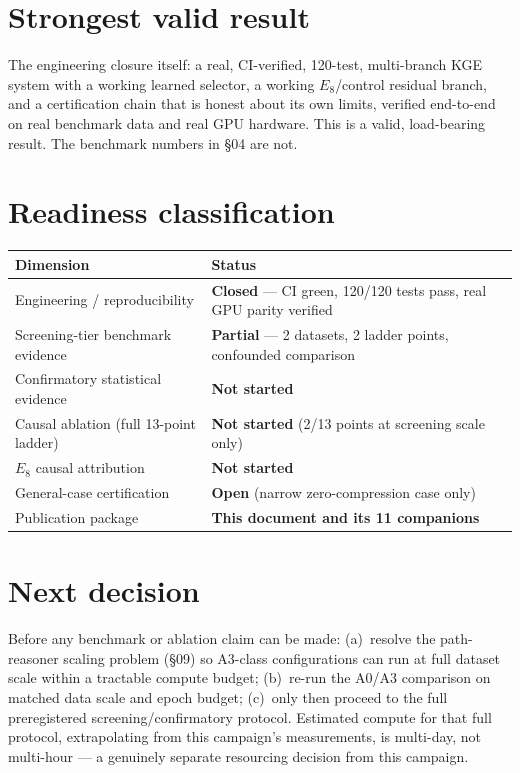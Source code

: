 \documentclass[11pt]{article}
\begin{document}
\section{Strongest valid result}
The engineering closure itself: a real, CI-verified, 120-test, multi-branch KGE system with a
working learned selector, a working $E_8$/control residual branch, and a certification chain that
is honest about its own limits, verified end-to-end on real benchmark data and real GPU hardware.
This is a valid, load-bearing result. The benchmark numbers in \S04 are not.

\section{Readiness classification}
\begin{center}
\begin{tabular}{@{}p{}p{}@{}}
\toprule
Dimension & Status \\
\midrule
Engineering / reproducibility & \textbf{Closed} --- CI green, 120/120 tests pass, real GPU parity verified \\
Screening-tier benchmark evidence & \textbf{Partial} --- 2 datasets, 2 ladder points, confounded comparison \\
Confirmatory statistical evidence & \textbf{Not started} \\
Causal ablation (full 13-point ladder) & \textbf{Not started} (2/13 points at screening scale only) \\
$E_8$ causal attribution & \textbf{Not started} \\
General-case certification & \textbf{Open} (narrow zero-compression case only) \\
Publication package & \textbf{This document and its 11 companions} \\
\bottomrule
\end{tabular}
\end{center}

\section{Next decision}
Before any benchmark or ablation claim can be made: (a)~resolve the path-reasoner scaling problem
(\S09) so A3-class configurations can run at full dataset scale within a tractable compute budget;
(b)~re-run the A0/A3 comparison on matched data scale and epoch budget; (c)~only then proceed to
the full preregistered screening/confirmatory protocol. Estimated compute for that full protocol,
extrapolating from this campaign's measurements, is multi-day, not multi-hour --- a genuinely
separate resourcing decision from this campaign.
\end{document}
